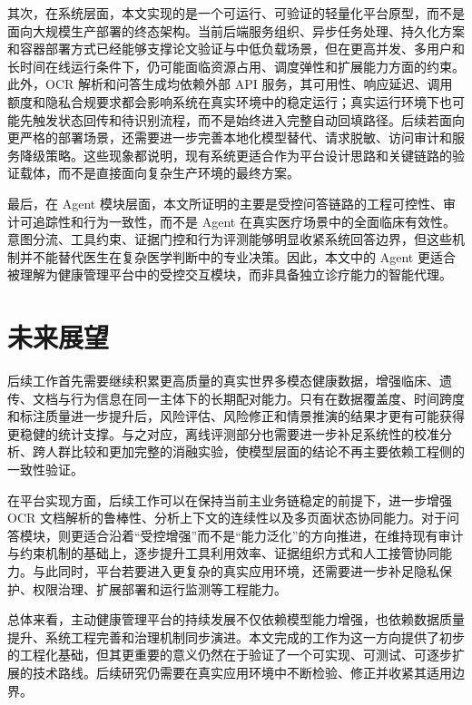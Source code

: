 其次，在系统层面，本文实现的是一个可运行、可验证的轻量化平台原型，而不是面向大规模生产部署的终态架构。当前后端服务组织、异步任务处理、持久化方案和容器部署方式已经能够支撑论文验证与中低负载场景，但在更高并发、多用户和长时间在线运行条件下，仍可能面临资源占用、调度弹性和扩展能力方面的约束。此外，OCR 解析和问答生成均依赖外部 API 服务，其可用性、响应延迟、调用额度和隐私合规要求都会影响系统在真实环境中的稳定运行；真实运行环境下也可能先触发状态回传和待识别流程，而不是始终进入完整自动回填路径。后续若面向更严格的部署场景，还需要进一步完善本地化模型替代、请求脱敏、访问审计和服务降级策略。这些现象都说明，现有系统更适合作为平台设计思路和关键链路的验证载体，而不是直接面向复杂生产环境的最终方案。

最后，在 Agent 模块层面，本文所证明的主要是受控问答链路的工程可控性、审计可追踪性和行为一致性，而不是 Agent 在真实医疗场景中的全面临床有效性。意图分流、工具约束、证据门控和行为评测能够明显收紧系统回答边界，但这些机制并不能替代医生在复杂医学判断中的专业决策。因此，本文中的 Agent 更适合被理解为健康管理平台中的受控交互模块，而非具备独立诊疗能力的智能代理。

\section{未来展望}

后续工作首先需要继续积累更高质量的真实世界多模态健康数据，增强临床、遗传、文档与行为信息在同一主体下的长期配对能力。只有在数据覆盖度、时间跨度和标注质量进一步提升后，风险评估、风险修正和情景推演的结果才更有可能获得更稳健的统计支撑。与之对应，离线评测部分也需要进一步补足系统性的校准分析、跨人群比较和更加完整的消融实验，使模型层面的结论不再主要依赖工程侧的一致性验证。

在平台实现方面，后续工作可以在保持当前主业务链稳定的前提下，进一步增强 OCR 文档解析的鲁棒性、分析上下文的连续性以及多页面状态协同能力。对于问答模块，则更适合沿着“受控增强”而不是“能力泛化”的方向推进，在维持现有审计与约束机制的基础上，逐步提升工具利用效率、证据组织方式和人工接管协同能力。与此同时，平台若要进入更复杂的真实应用环境，还需要进一步补足隐私保护、权限治理、扩展部署和运行监测等工程能力。

总体来看，主动健康管理平台的持续发展不仅依赖模型能力增强，也依赖数据质量提升、系统工程完善和治理机制同步演进。本文完成的工作为这一方向提供了初步的工程化基础，但其更重要的意义仍然在于验证了一个可实现、可测试、可逐步扩展的技术路线。后续研究仍需要在真实应用环境中不断检验、修正并收紧其适用边界。
